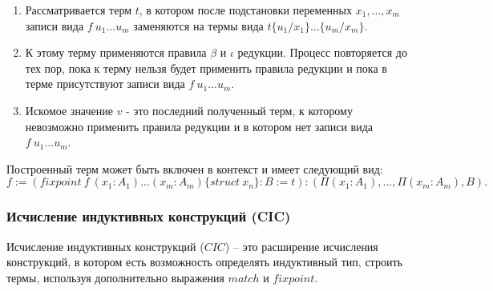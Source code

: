 \documentclass[12pt]{article}
\begin{document}
\begin{enumerate}
 \item Рассматривается терм $t$, в котором после подстановки переменных $x_1,...,x_m$ записи вида $f\ u_1...u_m$ заменяются на термы вида $t\{u_1/x_1\}...\{u_m/x_m\}$.
    \item К этому терму применяются правила $\beta$ и $\iota$ редукции. Процесс повторяется до тех пор, пока к терму нельзя будет применить правила редукции и пока в терме присутствуют записи вида $f\ u_1...u_m$.
    \item Искомое значение $v$ - это последний полученный терм, к которому невозможно применить правила редукции и в котором нет записи вида $f\ u_1...u_m$.
\end{enumerate}

Построенный терм может быть включен в контекст и имеет следующий вид: 
$$f:= (fixpoint\ f\ (x_1:A_1)...(x_m:A_m)\{struct\ x_n\}:B:=t):(\Pi (x_1:A_1),...,\Pi (x_m:A_m), B).$$

\subsubsection{Исчисление индуктивных конструкций (CIC)}
Исчисление индуктивных конструкций ($CIC$) -- это расширение исчисления конструкций, в котором есть возможность определять индуктивный тип, строить термы, используя дополнительно выражения $match$ и $fixpoint$.
\end{document}
